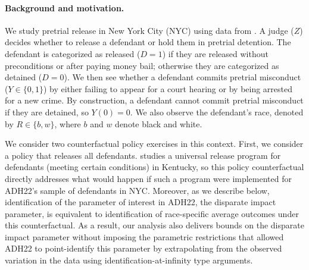 \documentclass[12pt]{article}%
\theoremstyle{definition}
\newcommand\1{\operatorname{I}\indicatorfence}
\begin{document}
\paragraph{Background and motivation.} We study pretrial release in New York City (NYC) using
data from \textcite[][henceforth ADH22]{adh22}. A judge ($Z$) decides whether to
release a defendant or hold them in pretrial detention. The defendant is
categorized as released ($D=1$) if they are released without preconditions or
after paying money bail; otherwise they are categorized as detained ($D=0$). We
then see whether a defendant commits pretrial misconduct ($Y \in \{0,1\}$) by
either failing to appear for a court hearing or by being arrested for a new
crime. By construction, a defendant cannot commit pretrial misconduct if they
are detained, so $Y(0) = 0$. We also observe the defendant's race, denoted by
$R \in \{b, w\}$, where $b$ and $w$ denote black and white.

We consider two counterfactual policy exercises in this context. First, we
consider a policy that releases all defendants. \Textcite{albright22} studies a
universal release program for defendants (meeting certain conditions) in
Kentucky, so this policy counterfactual directly addresses what would happen if
such a program were implemented for ADH22's sample of defendants in NYC\@.
Moreover, as we describe below, identification of the parameter of interest in
ADH22, the disparate impact parameter, is equivalent to identification of
race-specific average outcomes under this counterfactual. As a result, our
analysis also delivers bounds on the disparate impact parameter without imposing
the parametric restrictions that allowed ADH22 to point-identify this parameter
by extrapolating from the observed variation in the data using identification-at-infinity type arguments.
\end{document}
